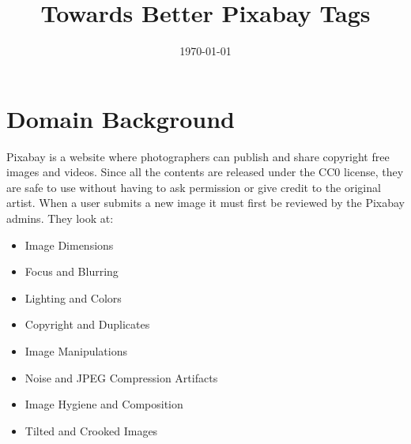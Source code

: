 \documentclass[10pt, a4paper, twocolumn]{article} %
\title{Towards Better Pixabay Tags} %
\author{
	\authorstyle{Willie Maddox} %
}
\date{\today} %
\begin{document}
\maketitle %

\thispagestyle{firstpage} %




\section{Domain Background} %

Pixabay is a website where photographers can publish and share copyright free images and videos.  Since all the contents are released under the CC0 license, they are safe to use without having to ask permission or give credit to the original artist. When a user submits a new image it must first be reviewed by the Pixabay admins.  They look at: 

\begin{itemize}
	\item Image Dimensions
	\item Focus and Blurring
	\item Lighting and Colors
	\item Copyright and Duplicates
	\item Image Manipulations
	\item Noise and JPEG Compression Artifacts
	\item Image Hygiene and Composition
	\item Tilted and Crooked Images
\end{itemize}
\end{document}
